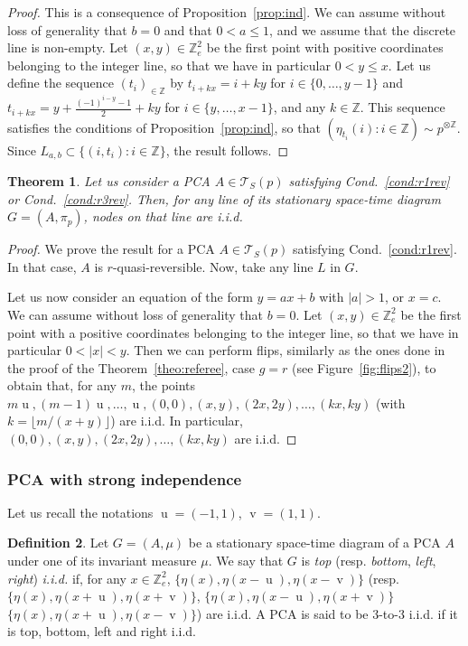 \documentclass[10pt]{amsart}
\newtheorem{theo}{Theorem}[section]
\theoremstyle{definition}\newtheorem{defi}[theo]{Definition}\newtheorem{rema}[theo]{Remark}\newtheorem{exam}[theo]{Example}\newtheorem{exem}[theo]{Example}\newtheorem{nota}[theo]{Notation}
\newcounter{a}
\newcommand{\Cond}{Cond.}
\newcommand{\triangE}[1]{\mathcal{T}_{#1}}
\newcommand{\Z}{\mathbb{Z}}
\DeclareMathOperator{\vu}{u}
\DeclareMathOperator{\vv}{v}
\begin{document}
\begin{proof}
This is a consequence of Proposition~\ref{prop:ind}. We can assume without loss of generality that $b=0$ and that $0< a \leq 1$, and we assume that the discrete line is non-empty. Let $(x,y)\in\Z_{e}^2$ be the first point with positive coordinates belonging to the integer line, so that we have in particular $0< y \leq x$. Let us define the sequence $(t_i)_{\in \Z}$ by $t_{i+kx}=i+ky$ for $i\in\{0,\ldots,y-1\}$ and $t_{i+kx}=y+\frac{(-1)^{i-y}-1}{2}+ky$ for $i\in\{y,\ldots,x-1\}$, and any $k\in\Z$. This sequence satisfies the conditions of Proposition~\ref{prop:ind}, so that $(\eta_{t_i}(i) : i\in\Z)\sim p^{\otimes \Z}$. Since $L_{a,b}\subset \{(i,t_i) : i\in \Z\}$, the result follows.
\end{proof}

\begin{theo}\label{theo:iid_lines2}
Let us consider a PCA $A\in \triangE{S}(p)$ satisfying \Cond~\ref{cond:r1rev} or \Cond~\ref{cond:r3rev}. Then, for any line of its stationary space-time diagram $G=(A,\pi_p)$, nodes on that line are i.i.d.
\end{theo}

\begin{proof}
We prove the result for a PCA $A\in \triangE{S}(p)$ satisfying \Cond~\ref{cond:r1rev}. In that case, $A$ is $r$-quasi-reversible. Now, take any line $L$ in $G$.

Let us now consider an equation of the form $y=ax+b$ with $|a|>1$, or $x=c$. We can assume without loss of generality that $b=0$. Let $(x,y) \in \Z_{e}^2$ be the first point with a positive coordinates belonging to the integer line, so that we have in particular $0<|x|<y$. Then we can perform flips, similarly as the ones done in the proof of the Theorem~\ref{theo:referee}, case $g=r$ (see Figure~\ref{fig:flips2}), to obtain that, for any $m$, the points $m\vu, (m-1)\vu, \ldots, \vu, (0,0), (x,y), (2x,2y), \dots, (kx,ky)$ (with $k = \lfloor m/(x+y) \rfloor$) are i.i.d. In particular, $(0,0), (x,y), (2x,2y), \dots, (kx,ky)$ are i.i.d.
\end{proof}

\subsubsection*{PCA with strong independence}
Let us recall the notations $\vu= (-1,1)$, $\vv = (1,1)$.

\begin{defi}\label{def:lrind}
Let $G=(A,\mu)$ be a stationary space-time diagram of a PCA $A$ under one of its invariant measure $\mu$. We say that $G$ is \emph{top} (resp. \emph{bottom}, \emph{left}, \emph{right}) \emph{i.i.d.} if, for any $x \in \Z_{e}^2$, $\{\eta(x), \eta(x-\vu),\eta(x-\vv)\}$ (resp.$\{\eta(x),\eta(x+\vu), \eta(x+\vv)\}$, $\{\eta(x),\eta(x-\vu),\eta(x+\vv)\}$ $\{\eta(x),\eta(x+\vu),\eta(x-\vv)\}$) are i.i.d. A PCA is said to be 3-to-3 i.i.d. if it is top, bottom, left and right i.i.d.
\end{defi}
\end{document}
